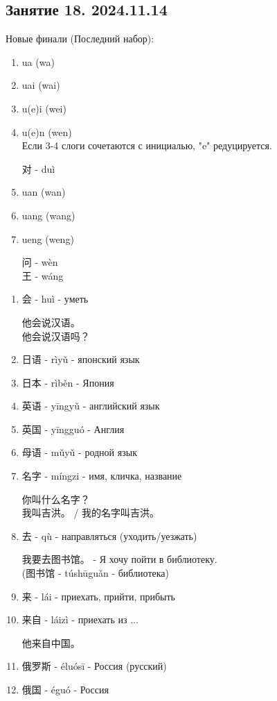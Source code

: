 \LARGE
\newpage
\subsection{Занятие 18. 2024.11.14}
Новые финали (Последний набор):
\begin{enumerate}
	\item ua (wa)
	\item uai (wai)
	\item u(e)i (wei)
	\item u(e)n (wen)\\
	Если 3-4 слоги сочетаются с инициалью, "e" редуцируется.
	\begin{example} \hfill\break
		对 - duì
	\end{example}
	\item uan (wan)
	\item uang (wang)
	\item ueng (weng)
	\begin{example} \hfill\break
		问 - wèn\\
		王 - wáng
	\end{example}
\end{enumerate}
\begin{newwords}\hfill
	\begin{enumerate}
		\item 会 - huì - уметь
		\begin{example}\hfill\break
			他会说汉语。\\
			他会说汉语吗？
		\end{example}
		\item 日语 - rìyǔ - японский язык
		\item 日本 - rìběn - Япония
		\item 英语 - yīngyǔ - английский язык
		\item 英国 - yīngguó - Англия
		\item 母语 - mǔyǔ - родной язык
		\item 名字 - míngzi - имя, кличка, название
		\begin{example}\hfill\break
			你叫什么名字？\\
			我叫吉洪。 / 我的名字叫吉洪。
		\end{example}
		\item 去 - qù - направляться (уходить/уезжать)	
		\begin{example}\hfill\break
			我要去图书馆。 - Я хочу пойти в библиотеку.\\
			(图书馆 - túshūguǎn - библиотека)
		\end{example}
		\item 来 - lái - приехать, прийти, прибыть
		\item 来自 - láizì - приехать из ...
		\begin{example}\hfill\break
			他来自中国。
		\end{example}
		\item 俄罗斯 - éluósī - Россия (русский)
		\item 俄国 - éguó - Россия
	\end{enumerate}
\end{newwords}